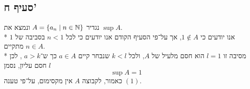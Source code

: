 \subsection{סעיף ח'}
נגדיר $A = \left\{ a_n \mid n \in \mathbb{N} \right\}$ ונמצא את $\sup A$. \\*
אנו יודעים כי $1 \notin A$, אך על־פי הסעיף הקודם אנו יודעים כי לכל $n < 1$ בסביבה של $1$ מתקיים $n \in A$. \\*
מסיבה זו $l = 1$ הוא חסם מלעיל של $A$, ולכל $k < l$ שנבחר קיים $a \in A$ כך ש־$a > k$ \footnotemark, לכן $l$ חסם עליון, נסמן
\[
	\sup A = 1
\]
כאמור, לקבוצה $A$ אין מקסימום, על־פי טענה $(1)$.


